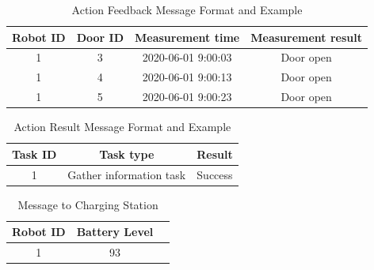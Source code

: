 \begin{table}
\centering
{}
\caption{Action Goal Message Format and Example}
\label{tab:goal_message}
\end{table}

\begin{table}
\centering
\begin{tabular}{|c|c|c|c|} 
\hline
Robot ID & Door ID & Measurement time & Measurement result \\
\hline\hline
1 & 3 & 2020-06-01 9:00:03 & Door open \\ 
1 & 4 & 2020-06-01 9:00:13 & Door open \\ 
1 & 5 & 2020-06-01 9:00:23 & Door open \\ 
\hline
\end{tabular}
\caption{Action Feedback Message Format and Example}
\label{tab:feedback_message}
\end{table}

\begin{table}
\centering
\begin{tabular}{|c|c|c|} 
\hline
Task ID & Task type & Result\\
\hline\hline
1 & Gather information task & Success \\ [1ex] 
\hline
\end{tabular}
\caption{Action Result Message Format and Example}
\label{tab:result_message}
\end{table}


\begin{table}
\centering
\begin{tabular}{|c|c|c|} 
\hline
Robot ID & Battery Level \\
\hline\hline
1 & 93 \\ [1ex] 
\hline
\end{tabular}
\caption{Message to Charging Station}
\label{tab:message_to_charging_staion}
\end{table}

